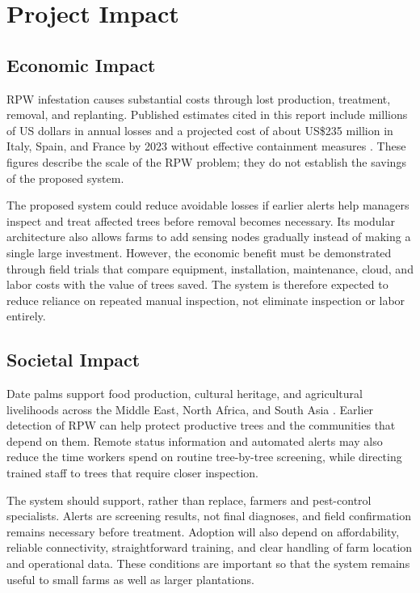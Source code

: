 \documentclass[12pt,a4paper,oneside]{memoir}
\newcommand{\earlierrevision}[1]{#1}
\begin{document}
\section{Project Impact}
\label{sec:Impact}
 
\subsection{Economic Impact}
 
\earlierrevision{RPW infestation causes substantial costs through lost production, treatment, removal, and replanting. Published estimates cited in this report include millions of US dollars in annual losses and a projected cost of about US\$235 million in Italy, Spain, and France by 2023 without effective containment measures \cite{ashry2020,saleem2022}. These figures describe the scale of the RPW problem; they do not establish the savings of the proposed system.}

\earlierrevision{The proposed system could reduce avoidable losses if earlier alerts help managers inspect and treat affected trees before removal becomes necessary. Its modular architecture also allows farms to add sensing nodes gradually instead of making a single large investment. However, the economic benefit must be demonstrated through field trials that compare equipment, installation, maintenance, cloud, and labor costs with the value of trees saved. The system is therefore expected to reduce reliance on repeated manual inspection, not eliminate inspection or labor entirely.}
 
\subsection{Societal Impact}
 
\earlierrevision{Date palms support food production, cultural heritage, and agricultural livelihoods across the Middle East, North Africa, and South Asia \cite{saleem2022}. Earlier detection of RPW can help protect productive trees and the communities that depend on them. Remote status information and automated alerts may also reduce the time workers spend on routine tree-by-tree screening, while directing trained staff to trees that require closer inspection.}

\earlierrevision{The system should support, rather than replace, farmers and pest-control specialists. Alerts are screening results, not final diagnoses, and field confirmation remains necessary before treatment. Adoption will also depend on affordability, reliable connectivity, straightforward training, and clear handling of farm location and operational data. These conditions are important so that the system remains useful to small farms as well as larger plantations.}
\end{document}
